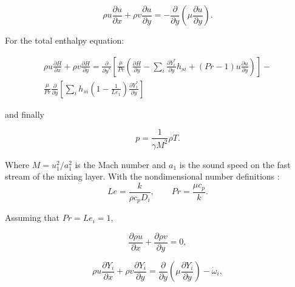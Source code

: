 \begin{equation} 
\rho u\frac{\partial u}{\partial x}+
\rho v\frac{\partial u}{\partial y}=-
\frac{\partial}{\partial y}
\left(\mu\frac{\partial u}{\partial y}\right)
.
\end{equation} 

For the total enthalpy equation:

\begin{equation} 
\begin{split} 
\rho u\frac{\partial H}{\partial x}+
\rho v\frac{\partial H}{\partial y}
=
\frac{\partial}{\partial y^*}
\left[
    \frac{\mu}{Pr} 
    \left(
    \frac{\partial H}{\partial y}
    -
    \sum_i
    \frac{\partial Y_i^*}{\partial y}
    h_{si}
    +
    \left(
    Pr
    -
    1
    \right)
    u
    \frac{\partial u}{\partial y}
    \right)
\right]
-
\\
\frac{\mu}{Pr} 
\frac{\partial}{\partial y}
    \left[
        \sum_i
        h_{si}
        \left(
            1
            -
            \frac{1}{Le_1} 
        \right)
        \frac{\partial Y^*_i}{\partial y}
    \right]
\end{split} 
\end{equation} 

and finally  

\begin{equation} 
p=\frac{1}{\gamma M^2} \rho T
.
\end{equation} 

Where $M=u_1^2/a_1^2$ is the Mach number 
and  $a_1$ 
is the sound speed on the fast stream of the mixing layer. 
With the nondimensional number definitions :
\begin{equation} 
Le
=
\frac{k}{\rho c_p D_i}
,
\qquad
Pr
=
\frac{\mu c_p}{k}
.
\end{equation} 

Assuming that $Pr=Le_i=1$, 

\begin{equation} 
\frac{\partial \rho u }{\partial x}+
\frac{\partial \rho v }{\partial y}
=0
,
\end{equation}


\begin{equation} 
\rho u\frac{\partial Y_{i}}{\partial x}+
\rho v\frac{\partial Y_{i}}{\partial y}
=
\frac{\partial}{\partial y}
\left(\mu \frac{\partial Y_i}{\partial y}\right)
-
\dot{\omega}_i
,
\end{equation} 

